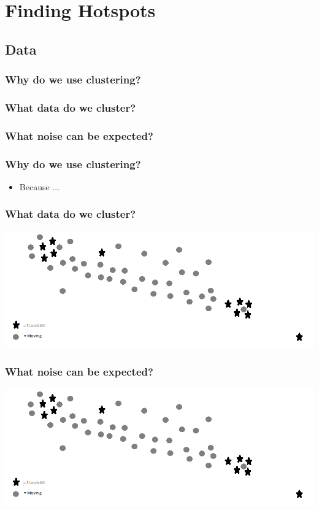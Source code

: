 \section{Finding Hotspots}

\subsection{Data}
\subsubsection{Why do we use clustering?}
\subsubsection{What data do we cluster?}
\subsubsection{What noise can be expected?}
\begin{frame}
\frametitle{Why do we use clustering?}
	\begin{itemize}
		\item Because ...
	\end{itemize}
\end{frame}	
\begin{frame}
\frametitle{What data do we cluster?}
	\begin{center}
		\includegraphics[scale=0.5]{graphics/pointtype-example}
	\end{center}
\end{frame}	
\begin{frame}
\frametitle{What noise can be expected?}
	\begin{center}
		\includegraphics[scale=0.5]{graphics/pointtype-example}
	\end{center}
\end{frame}	


